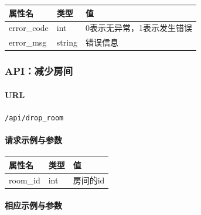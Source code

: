 \documentclass[]{article}
\let\oldparagraph\paragraph
\renewcommand{\paragraph}[1]{\oldparagraph{#1}\mbox{}}
\begin{document}
\begin{longtable}[]{@{}lll@{}}
\toprule
属性名 & 类型 & 值\tabularnewline
\midrule
\endhead
error\_code & int & 0表示无异常，1表示发生错误\tabularnewline
error\_msg & string & 错误信息\tabularnewline
\bottomrule
\end{longtable}

\hypertarget{apiux51cfux5c11ux623fux95f4}{%
\subsubsection{API：减少房间}\label{apiux51cfux5c11ux623fux95f4}}

\hypertarget{url-14}{%
\paragraph{URL}\label{url-14}}

\texttt{/api/drop\_room}

\hypertarget{ux8bf7ux6c42ux793aux4f8bux4e0eux53c2ux6570-1}{%
\paragraph{请求示例与参数}\label{ux8bf7ux6c42ux793aux4f8bux4e0eux53c2ux6570-1}}

\begin{Shaded}
\begin{Highlighting}[]
\FunctionTok{\{}
    \FunctionTok{:}
\FunctionTok{\}}
\end{Highlighting}
\end{Shaded}

\begin{longtable}[]{@{}lll@{}}
\toprule
属性名 & 类型 & 值\tabularnewline
\midrule
\endhead
room\_id & int & 房间的id\tabularnewline
\bottomrule
\end{longtable}

\hypertarget{ux76f8ux5e94ux793aux4f8bux4e0eux53c2ux6570-1}{%
\paragraph{相应示例与参数}\label{ux76f8ux5e94ux793aux4f8bux4e0eux53c2ux6570-1}}

\begin{Shaded}
\begin{Highlighting}[]
\FunctionTok{\{}
    \FunctionTok{:}\FunctionTok{,}
    \FunctionTok{:}
\FunctionTok{\}}
\end{Highlighting}
\end{Shaded}
\end{document}
